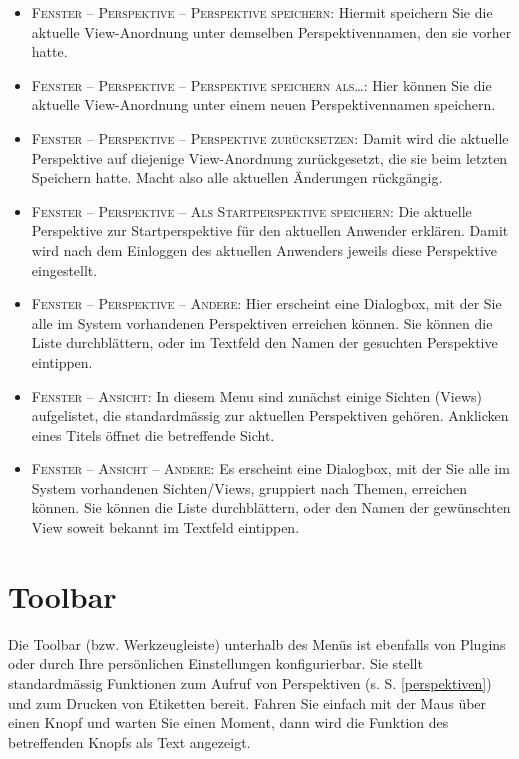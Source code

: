 \begin{itemize}
{  diesem Menüpunkt ein Häkchen ist, können wesentliche Views nicht geschlossen
  werden.}
  \item {\textsc{Fenster -- Perspektive -- Perspektive speichern}: Hiermit
  speichern Sie die aktuelle View-Anordnung unter demselben Perspektivennamen,
  den sie vorher hatte.}
  \item {\textsc{Fenster -- Perspektive -- Perspektive speichern als\ldots}:
  Hier können Sie die aktuelle View-Anordnung unter einem neuen
  Perspektivennamen speichern.}
  \item {\textsc{Fenster -- Perspektive -- Perspektive zurücksetzen}: Damit wird
  die aktuelle Perspektive auf diejenige View-Anordnung zurückgesetzt, die sie
  beim letzten Speichern hatte. Macht also alle aktuellen Änderungen
  rückgängig.}
  \item {\textsc{Fenster -- Perspektive -- Als Startperspektive speichern}: Die
  aktuelle Perspektive zur Startperspektive für den aktuellen Anwender erklären.
  Damit wird nach dem Einloggen des aktuellen Anwenders jeweils diese
  Perspektive eingestellt.}
  \item {\textsc{Fenster -- Perspektive -- Andere}: Hier erscheint eine
  Dialogbox, mit der Sie alle im System vorhandenen Perspektiven erreichen
  können. Sie können die Liste durchblättern, oder im Textfeld den Namen der
  gesuchten Perspektive eintippen.}
  \item {\textsc{Fenster -- Ansicht}: In diesem Menu sind zunächst einige
  Sichten (Views) aufgelistet, die standardmässig zur aktuellen Perspektiven
  gehören. Anklicken eines Titels öffnet die betreffende Sicht.}
  \item {\textsc{Fenster -- Ansicht -- Andere}: Es erscheint eine Dialogbox, mit
  der Sie alle im System vorhandenen Sichten/Views, gruppiert nach Themen, erreichen
  können. Sie können die Liste durchblättern, oder den Namen der gewünschten
  View soweit bekannt im Textfeld eintippen.}
\end{itemize}

\section{Toolbar}
Die Toolbar (bzw. Werkzeugleiste) unterhalb des Menüs ist ebenfalls von Plugins
oder durch Ihre persönlichen Einstellungen konfigurierbar. Sie stellt
standardmässig Funktionen zum Aufruf von Perspektiven (s. S. \ref{perspektiven})
und zum Drucken von Etiketten bereit. Fahren Sie einfach mit der Maus über einen Knopf und warten Sie einen Moment, dann wird die Funktion des betreffenden Knopfs als Text angezeigt. 